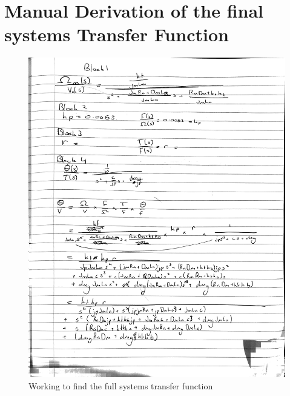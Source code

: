 \documentclass[a4paper, 11pt, compsoc]{IEEEtran}
\begin{document}
        \section{Manual Derivation of the final systems Transfer Function}\label{app:fullTF}
            \begin{figure}[!h]
                \centering
                \includegraphics[width=\columnwidth]{fullTFDerivation.jpg}
                \caption{Working to find the full systems transfer function}
                \label{fig:workingTF}
            \end{figure}
\end{document}
